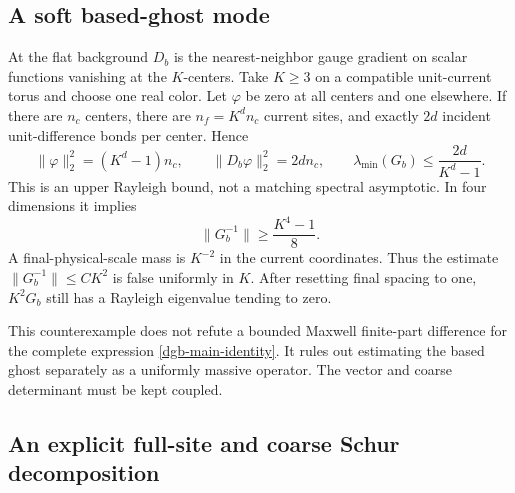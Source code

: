 \documentclass[11pt]{article}
\theoremstyle{remark}
\begin{document}
\subsection{A soft based-ghost mode}
\label{dgb-soft-ghost-section}

At the flat background $D_b$ is the nearest-neighbor gauge
gradient on scalar functions vanishing at the $K$-centers.
Take $K\geq3$ on a compatible unit-current torus and choose
one real color. Let $\varphi$ be zero at all centers and
one elsewhere. If there are $n_c$ centers, there are
$n_f=K^dn_c$ current sites, and exactly $2d$ incident
unit-difference bonds per center. Hence
\begin{equation}
 \|\varphi\|_2^2=(K^d-1)n_c,\qquad
 \|D_b\varphi\|_2^2=2dn_c,\qquad
 \lambda_{\min}(G_b)\leq\frac{2d}{K^d-1}.
 \label{dgb-Rayleigh}
\end{equation}
This is an upper Rayleigh bound, not a matching spectral
asymptotic. In four dimensions it implies
\[
                         \|G_b^{-1}\|\geq\frac{K^4-1}{8}.
\]
A final-physical-scale mass is $K^{-2}$ in the current
coordinates. Thus the estimate $\|G_b^{-1}\|\leq CK^2$
is false uniformly in $K$. After resetting final spacing
to one, $K^2G_b$ still has a Rayleigh eigenvalue tending
to zero.

This counterexample does not refute a bounded Maxwell
finite-part difference for the complete expression
\eqref{dgb-main-identity}. It rules out estimating the
based ghost separately as a uniformly massive operator.
The vector and coarse determinant must be kept coupled.

\subsection{An explicit full-site and coarse Schur decomposition}
\label{dgb-full-Schur-section}
\end{document}
